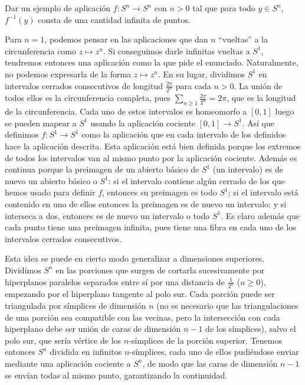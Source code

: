 \documentclass[twoside]{article}
\begin{document}
\newpage

\begin{ejercicio}{}
Dar un ejemplo de aplicación $f:S^n\to S^n$ con $n>0$ tal que para todo $y\in S^{n}$, $f^{-1}(y)$ consta de una cantidad infinita de puntos. 
\end{ejercicio}
\begin{solucion}
Para $n=1$, podemos pensar en las aplicaciones que dan $n$ ``vueltas'' a la circunferencia como $z\mapsto z^n$. Si conseguimos darle infinitas vueltas a $S^1$, tendremos entonces una aplicación como la que pide el enunciado. Naturalmente, no podemos expresarla de la forma $z\mapsto z^n$. En su lugar, dividimos $S^1$ en intervalos cerrados consecutivos de longitud $\frac{2\pi }{2^n}$ para cada $n>0$. La unión de todos ellos es la circunferencia completa, pues $\sum_{n\geq 1}\frac{2\pi }{2^n}=2\pi$, que es la longitud de la circunferencia. Cada uno de estos intervalos es homeomorfo a $[0,1]$ luego se pueden mapear a $S^1$ usando la aplicación cociente $[0,1]\to S^1$. Así que definimos $f:S^1\to S^1$ como la aplicación que en cada intervalo de los definidos hace la aplicación descrita. Esta aplicación está bien definida porque los extremos de todos los intervalos van al mismo punto por la aplicación cociente. Además es continua porque la preimagen de un abierto básico de $S^1$  (un intervalo) es de nuevo un abierto básico o $S^1$: si el intervalo contiene algún cerrado de los que hemos usado para definir $f$, entonces su preimagen es todo $S^1$; si el intervalo está contenido en uno de ellos entonces la preimagen es de nuevo un intervalo; y si interseca a dos, entonces es de nuevo un intervalo o todo $S^1$. Es claro además que cada punto tiene una preimagen infinita, pues tiene una fibra en cada uno de los intervalos cerrados consecutivos. 

Esta idea se puede en cierto modo generalizar a dimensiones superiores. Dividimos $S^n$ en las porciones que surgen de cortarla sucesivamente por hiperplanos paralelos separados entre sí por una distancia de $\frac{1}{2^n}$ ($n\geq 0$), empezando por el hiperplano tangente al polo sur. Cada porción puede ser triangulada por símplices de dimensión $n$ (no es necesario que las triangulaciones de una porción sea compatible con las vecinas, pero la intersección con cada hiperplano debe ser unión de caras de dimensión $n-1$ de los símplices), salvo el polo sur, que sería vértice de los $n$-símplices de la porción superior. Tenemos entonces $S^n$ dividida en infinitos $n$-símplices, cada uno de ellos pudiéndose enviar mediante una aplicación cociente a $S^n$, de modo que las caras de dimensión $n-1$ se envían todas al mismo punto, garantizando la continuidad. 


\end{solucion}
\end{document}
